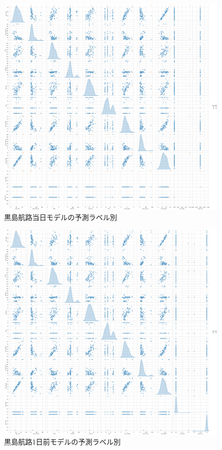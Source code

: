 \begin{figure}[H]
 \centering
 \includegraphics[keepaspectratio, scale=0.25]{fig/chapter4/kurosima_0_pred.png}
 \caption{黒島航路当日モデルの予測ラベル別}
 \label{kurosima_0_scatter_pred}
\end{figure}

\begin{figure}[H]
 \centering
 \includegraphics[keepaspectratio, scale=0.25]{fig/chapter4/kurosima_1_pred.png}
 \caption{黒島航路1日前モデルの予測ラベル別}
 \label{kurosima_1_scatter_pred}
\end{figure}

